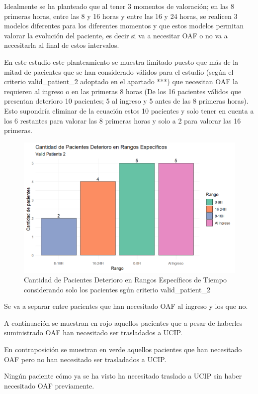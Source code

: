 Idealmente se ha planteado que al tener 3 momentos de valoración; en las 8 primeras horas, entre las 8 y 16 horas y entre las 16 y 24 horas, se realicen 3 modelos diferentes para los diferentes momentos y que estos modelos permitan valorar la evolución del paciente, es decir si va a necesitar OAF o no va a necesitarla al final de estos intervalos.

En este estudio este planteamiento se muestra limitado puesto que más de la mitad de pacientes que se han considerado válidos para el estudio (según el criterio valid_patient_2 adoptado en el apartado ***) que necesitan OAF la requieren al ingreso o en las primeras 8 horas (De los 16 pacientes válidos que presentan deterioro 10 pacientes; 5 al ingreso y 5 antes de las 8 primeras horas). Esto supondría eliminar de la ecuación estos 10 pacientes y solo tener en cuenta a los 6 restantes para valorar las 8 primeras horas y solo a 2 para valorar las 16 primeras.

\begin{figure}[H]
    \centering
    \includegraphics[scale = 1]{./img/bar-deterioro-valid-2.png}
    \caption{Cantidad de Pacientes Deterioro en Rangos Específicos de Tiempo considerando solo los pacientes sgún criterio valid\_patient\_2}
    \label{fig:bar-deterioro-valid-2}
\end{figure}

Se va a separar entre pacientes que han necesitado OAF al ingreso y los que no.

A continuación se muestran en rojo aquellos pacientes que a pesar de haberles suministrado OAF han necesitado ser trasladados a UCIP.

En contraposición se muestran en verde aquellos pacientes que han necesitado OAF pero no han necesitado ser trasladados a UCIP. 



Ningún paciente cómo ya se ha visto ha necesitado traslado a UCIP sin haber necesitado OAF previamente.

